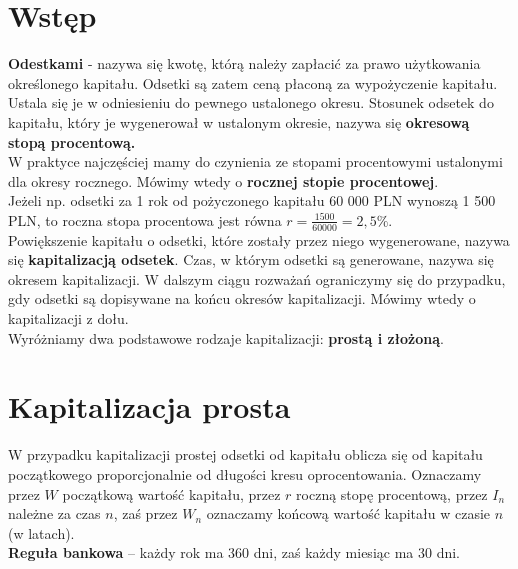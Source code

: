 \documentclass{article}
\begin{document}
\tableofcontents

\newpage

%
%

\section{Wstęp}

\textbf{Odestkami} - nazywa się kwotę, którą należy zapłacić za prawo użytkowania określonego kapitału. Odsetki są zatem ceną płaconą za wypożyczenie kapitału. Ustala się je w odniesieniu do pewnego ustalonego okresu. Stosunek odsetek do kapitału, który je wygenerował w ustalonym okresie, nazywa się \textbf{okresową stopą procentową.}\\

W praktyce najczęściej mamy do czynienia ze stopami procentowymi ustalonymi dla okresy rocznego. Mówimy wtedy o \textbf{rocznej stopie procentowej}.\\

Jeżeli np. odsetki za 1 rok od pożyczonego kapitału 60 000 PLN wynoszą 1 500 PLN, to roczna stopa procentowa jest równa $ r = \frac{1 500}{60 000} = 2,5 \% $.\\

Powiększenie kapitału o odsetki, które zostały przez niego wygenerowane, nazywa się \textbf{kapitalizacją odsetek}. Czas, w którym odsetki są generowane, nazywa się okresem kapitalizacji. W dalszym ciągu rozważań ograniczymy się do przypadku, gdy odsetki są dopisywane na końcu okresów kapitalizacji. Mówimy wtedy o kapitalizacji z dołu.\\

Wyróżniamy dwa podstawowe rodzaje kapitalizacji: \textbf{prostą i złożoną}.\\

%
%

\section{Kapitalizacja prosta}

W przypadku kapitalizacji prostej odsetki od kapitału oblicza się od kapitału początkowego proporcjonalnie od długości kresu oprocentowania. Oznaczamy przez $ W $ początkową wartość kapitału, przez $ r $ roczną stopę procentową, przez $ I_{n} $ należne za czas $ n $, zaś przez $ W_{n} $ oznaczamy końcową wartość kapitału w czasie $ n $ (w latach).\\

\textbf{Reguła bankowa} – każdy rok ma 360 dni, zaś każdy miesiąc ma 30 dni.
\end{document}
